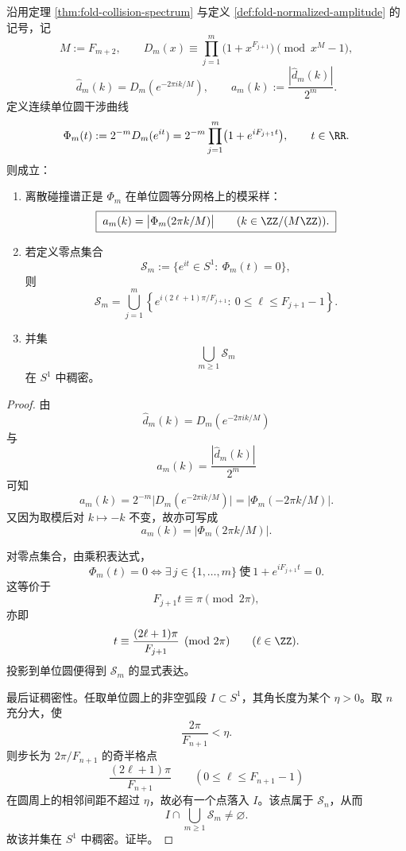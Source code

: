 \begin{theorem}\label{thm:xi-time-part60ae-fibonacci-interference-curve-sampling}
沿用定理 \ref{thm:fold-collision-spectrum} 与定义 \ref{def:fold-normalized-amplitude} 的记号，记
\[
M:=F_{m+2},
\qquad
D_m(x)\equiv \prod_{j=1}^{m}\bigl(1+x^{F_{j+1}}\bigr)\pmod{x^M-1},
\]
\[
\widehat d_m(k)=D_m(e^{-2\pi i k/M}),
\qquad
a_m(k):=\frac{|\widehat d_m(k)|}{2^m}.
\]
定义连续单位圆干涉曲线
\[
\Phi_m(t):=2^{-m}D_m(e^{it})
=
2^{-m}\prod_{j=1}^{m}\bigl(1+e^{iF_{j+1}t}\bigr),
\qquad
t\in\RR.
\]
则成立：
\begin{enumerate}
  \item 离散碰撞谱正是 \(\Phi_m\) 在单位圆等分网格上的模采样：
  \[
  \boxed{\;
  a_m(k)=\bigl|\Phi_m(2\pi k/M)\bigr|
  \qquad (k\in \ZZ/(M\ZZ)).\;}
  \]
  \item 若定义零点集合
  \[
  \mathcal S_m:=\{e^{it}\in S^1:\ \Phi_m(t)=0\},
  \]
  则
  \[
  \boxed{\;
  \mathcal S_m=
  \bigcup_{j=1}^{m}
  \left\{
  e^{i(2\ell+1)\pi/F_{j+1}}:\ 0\le \ell\le F_{j+1}-1
  \right\}.\;}
  \]
  \item 并集
  \[
  \bigcup_{m\ge 1}\mathcal S_m
  \]
  在 \(S^1\) 中稠密。
\end{enumerate}
\end{theorem}
\begin{proof}
由
\[
\widehat d_m(k)=D_m(e^{-2\pi i k/M})
\]
与
\[
a_m(k)=\frac{|\widehat d_m(k)|}{2^m}
\]
可知
\[
a_m(k)=2^{-m}\bigl|D_m(e^{-2\pi i k/M})\bigr|
=
\bigl|\Phi_m(-2\pi k/M)\bigr|.
\]
又因为取模后对 \(k\mapsto -k\) 不变，故亦可写成
\[
a_m(k)=\bigl|\Phi_m(2\pi k/M)\bigr|.
\]

对零点集合，由乘积表达式，
\[
\Phi_m(t)=0
\iff
\exists\,j\in\{1,\dots,m\}\ \text{使}\ 1+e^{iF_{j+1}t}=0.
\]
这等价于
\[
F_{j+1}t\equiv \pi \pmod{2\pi},
\]
亦即
\[
t\equiv \frac{(2\ell+1)\pi}{F_{j+1}}
\pmod{2\pi}
\qquad (\ell\in\ZZ).
\]
投影到单位圆便得到 \(\mathcal S_m\) 的显式表达。

最后证稠密性。任取单位圆上的非空弧段 \(I\subset S^1\)，其角长度为某个 \(\eta>0\)。取 \(n\) 充分大，使
\[
\frac{2\pi}{F_{n+1}}<\eta.
\]
则步长为 \(2\pi/F_{n+1}\) 的奇半格点
\[
\frac{(2\ell+1)\pi}{F_{n+1}}
\qquad (0\le \ell\le F_{n+1}-1)
\]
在圆周上的相邻间距不超过 \(\eta\)，故必有一个点落入 \(I\)。该点属于 \(\mathcal S_n\)，从而
\[
I\cap \bigcup_{m\ge 1}\mathcal S_m\neq \varnothing.
\]
故该并集在 \(S^1\) 中稠密。证毕。
\end{proof}

